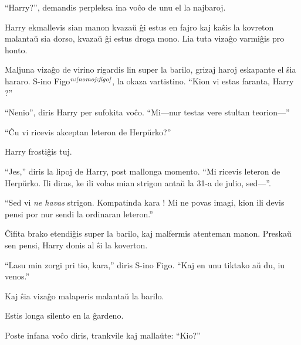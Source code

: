 ``Harry?'', demandis perpleksa ina voĉo de unu el la najbaroj.

Harry ekmallevis sian manon kvazaŭ ĝi estus en fajro kaj kaŝis la kovreton
malantaŭ sia dorso, kvazaŭ ĝi estus droga mono. Lia tuta vizaĝo varmiĝis pro
honto.

Maljuna vizaĝo de virino rigardis lin super la barilo, grizaj haroj eskapante el ŝia hararo. S-ino Figo$^{\textit{n:\ref{nomoj:figo}}}$, la okaza vartistino. ``Kion vi estas faranta, Harry ?''

``Nenio'', diris Harry per sufokita voĉo. ``Mi—nur testas vere stultan
teorion—''

``Ĉu vi ricevis akceptan leteron de Herpŭrko?''

Harry frostiĝis tuj.

``Jes,'' diris la lipoj de Harry, post mallonga momento. ``Mi ricevis leteron de
Herpŭrko. Ili diras, ke ili volas mian strigon antaŭ la 31-a de julio, sed—''.

``Sed vi \emph{ne havas} strigon. Kompatinda kara ! Mi ne povas imagi, kion ili
devis pensi por nur sendi la ordinaran leteron.''

Ĉifita brako etendiĝis super la barilo, kaj malfermis atenteman manon. Preskaŭ
sen pensi, Harry donis al ŝi la koverton.

``Lasu min zorgi pri tio, kara,'' diris S-ino Figo. ``Kaj en unu tiktako aŭ du, iu venos.''

Kaj ŝia vizaĝo malaperis malantaŭ la barilo.

Estis longa silento en la ĝardeno.

Poste infana voĉo diris, trankvile kaj mallaŭte: ``Kio?''
